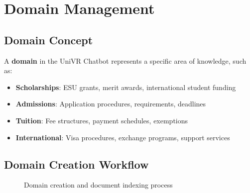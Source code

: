 \documentclass[12pt,a4paper]{article}
\begin{document}
\section{Domain Management}

\subsection{Domain Concept}

A \textbf{domain} in the UniVR Chatbot represents a specific area of knowledge, such as:
\begin{itemize}
    \item \textbf{Scholarships}: ESU grants, merit awards, international student funding
    \item \textbf{Admissions}: Application procedures, requirements, deadlines
    \item \textbf{Tuition}: Fee structures, payment schedules, exemptions
    \item \textbf{International}: Visa procedures, exchange programs, support services
\end{itemize}

\subsection{Domain Creation Workflow}

\begin{figure}[H]
    \centering
    \caption{Domain creation and document indexing process}
    \label{fig:domain-creation}
\end{figure}
\end{document}
